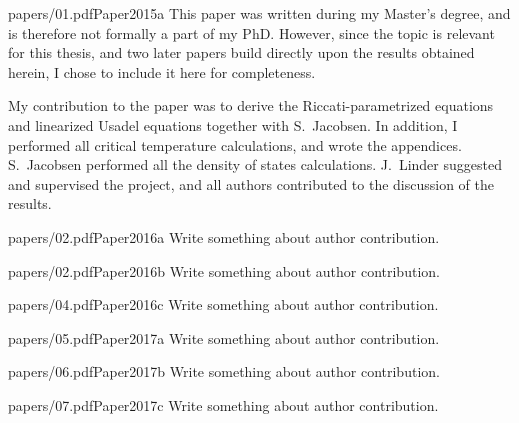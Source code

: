 \begin{paper}{papers/01.pdf}{Paper2015a}%
  This paper was written during my Master's degree, and is therefore not formally a part of my PhD.
  However, since the topic is relevant for this thesis, and two later papers build directly upon the results obtained herein, I chose to include it here for completeness.

  My contribution to the paper was to derive the Riccati-parametrized equations and linearized Usadel equations together with S.~Jacobsen.
  In addition, I performed all critical temperature calculations, and wrote the appendices.
  S.~Jacobsen performed all the density of states calculations.
  J.~Linder suggested and supervised the project, and all authors contributed to the discussion of the results.
\end{paper}

\begin{paper}{papers/02.pdf}{Paper2016a}
  Write something about author contribution.
\end{paper}

\begin{paper}{papers/02.pdf}{Paper2016b}
  Write something about author contribution.
\end{paper}

\begin{paper}{papers/04.pdf}{Paper2016c}
  Write something about author contribution.
\end{paper}

\begin{paper}{papers/05.pdf}{Paper2017a}
  Write something about author contribution.
\end{paper}

\begin{paper}{papers/06.pdf}{Paper2017b}
  Write something about author contribution.
\end{paper}

\begin{paper}{papers/07.pdf}{Paper2017c}
  Write something about author contribution.
\end{paper}

